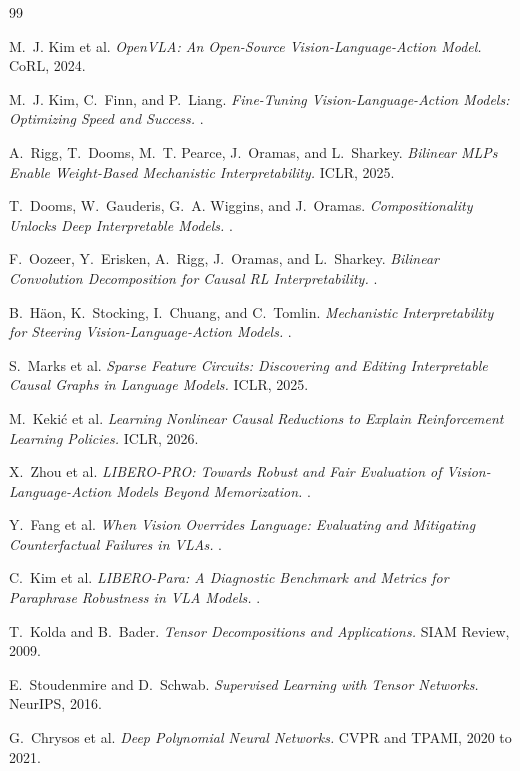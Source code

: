 \documentclass{article}
\begin{document}
\begin{thebibliography}{99}

M.~J. Kim et al.
\newblock \emph{OpenVLA: An Open-Source Vision-Language-Action Model.}
\newblock CoRL, 2024.

M.~J. Kim, C.~Finn, and P.~Liang.
\newblock \emph{Fine-Tuning Vision-Language-Action Models: Optimizing Speed and Success.}
.

A.~Rigg, T.~Dooms, M.~T. Pearce, J.~Oramas, and L.~Sharkey.
\newblock \emph{Bilinear MLPs Enable Weight-Based Mechanistic Interpretability.}
\newblock ICLR, 2025.

T.~Dooms, W.~Gauderis, G.~A. Wiggins, and J.~Oramas.
\newblock \emph{Compositionality Unlocks Deep Interpretable Models.}
.

F.~Oozeer, Y.~Erisken, A.~Rigg, J.~Oramas, and L.~Sharkey.
\newblock \emph{Bilinear Convolution Decomposition for Causal RL Interpretability.}
.

B.~H\"aon, K.~Stocking, I.~Chuang, and C.~Tomlin.
\newblock \emph{Mechanistic Interpretability for Steering Vision-Language-Action Models.}
.

S.~Marks et al.
\newblock \emph{Sparse Feature Circuits: Discovering and Editing Interpretable Causal Graphs
in Language Models.}
\newblock ICLR, 2025.

M.~Keki\'c et al.
\newblock \emph{Learning Nonlinear Causal Reductions to Explain Reinforcement Learning
Policies.}
\newblock ICLR, 2026.

X.~Zhou et al.
\newblock \emph{LIBERO-PRO: Towards Robust and Fair Evaluation of Vision-Language-Action
Models Beyond Memorization.}
.

Y.~Fang et al.
\newblock \emph{When Vision Overrides Language: Evaluating and Mitigating Counterfactual
Failures in VLAs.}
.

C.~Kim et al.
\newblock \emph{LIBERO-Para: A Diagnostic Benchmark and Metrics for Paraphrase Robustness in
VLA Models.}
.

T.~Kolda and B.~Bader.
\newblock \emph{Tensor Decompositions and Applications.}
\newblock SIAM Review, 2009.

E.~Stoudenmire and D.~Schwab.
\newblock \emph{Supervised Learning with Tensor Networks.}
\newblock NeurIPS, 2016.

G.~Chrysos et al.
\newblock \emph{Deep Polynomial Neural Networks.}
\newblock CVPR and TPAMI, 2020 to 2021.

\end{thebibliography}
\end{document}
